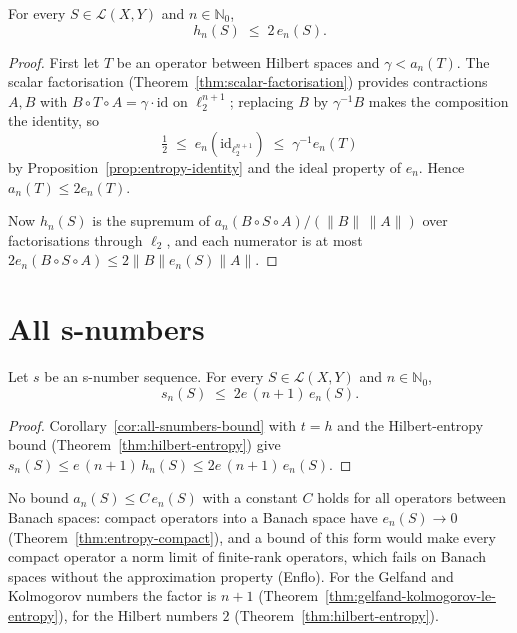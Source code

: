 \begin{theorem}
\label{thm:hilbert-entropy}
\leanok
{}
For every $S \in \mathcal{L}(X, Y)$ and $n \in \mathbb{N}_0$,
\[
  h_n(S) \;\le\; 2\, e_n(S) .
\]
\end{theorem}
\begin{proof}
\leanok
First let $T$ be an operator between Hilbert spaces and $\gamma < a_n(T)$.
The scalar factorisation (Theorem~\ref{thm:scalar-factorisation}) provides
contractions $A, B$ with
$B \circ T \circ A = \gamma \cdot \mathrm{id}$ on $\ell_2^{n+1}$; replacing
$B$ by $\gamma^{-1} B$ makes the composition the identity, so
\[
  \tfrac12 \;\le\; e_n(\mathrm{id}_{\ell_2^{n+1}})
  \;\le\; \gamma^{-1} e_n(T)
\]
by Proposition~\ref{prop:entropy-identity} and the ideal property of $e_n$.
Hence $a_n(T) \le 2 e_n(T)$.

Now $h_n(S)$ is the supremum of $a_n(B \circ S \circ A)/(\|B\|\,\|A\|)$ over
factorisations through $\ell_2$, and each numerator is at most
$2 e_n(B \circ S \circ A) \le 2 \|B\| e_n(S) \|A\|$.
\end{proof}

\section{All s-numbers}
\label{sec:all-snumbers-entropy}

\begin{corollary}
\label{cor:snumbers-entropy}
\leanok
{}
Let $s$ be an s-number sequence. For every $S \in \mathcal{L}(X, Y)$ and
$n \in \mathbb{N}_0$,
\[
  s_n(S) \;\le\; 2e\,(n+1)\, e_n(S) .
\]
\end{corollary}
\begin{proof}
\leanok
Corollary~\ref{cor:all-snumbers-bound} with $t = h$ and the Hilbert-entropy bound
(Theorem~\ref{thm:hilbert-entropy}) give
$s_n(S) \le e\,(n+1)\, h_n(S) \le 2e\,(n+1)\, e_n(S)$.
\end{proof}

\begin{remark}
No bound $a_n(S) \le C\, e_n(S)$ with a constant $C$ holds for all operators between
Banach spaces: compact operators into a Banach space have $e_n(S) \to 0$
(Theorem~\ref{thm:entropy-compact}), and a bound of this form would make every compact
operator a norm limit of finite-rank operators, which fails on Banach spaces without the
approximation property (Enflo). For the Gelfand and Kolmogorov numbers the factor is
$n+1$ (Theorem~\ref{thm:gelfand-kolmogorov-le-entropy}), for the Hilbert numbers $2$
(Theorem~\ref{thm:hilbert-entropy}).
\end{remark}

